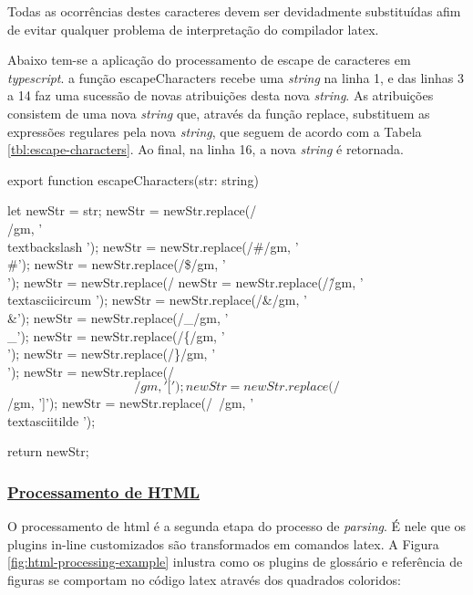 Todas as ocorrências destes caracteres devem ser devidadmente
substituídas afim de evitar qualquer problema de interpretação do
compilador
\acrshort{latex}.


Abaixo tem-se a aplicação do processamento de escape de caracteres
em \textit{typescript}. a função escapeCharacters recebe uma \textit{string} na linha 1,
e das linhas 3 a 14 faz uma sucessão de novas atribuições desta nova \textit{string}.
As atribuições consistem de uma nova \textit{string} que, através da função replace,
substituem as expressões regulares pela nova \textit{string}, que seguem de acordo
com a
Tabela \ref{tbl:escape-characters}.
Ao final, na linha 16, a nova \textit{string} é retornada.

\begin{codeEscape}
export function escapeCharacters(str: string){
    let newStr = str;
    newStr = newStr.replace(/\\/gm, '\\textbackslash ');
    newStr = newStr.replace(/#/gm, '\\#');
    newStr = newStr.replace(/\$/gm, '\\$$');
    newStr = newStr.replace(/%
    newStr = newStr.replace(/\^/gm, '\\textasciicircum ');
    newStr = newStr.replace(/&/gm, '\\&');
    newStr = newStr.replace(/_/gm, '\\_');
    newStr = newStr.replace(/\{/gm, '\\{');
    newStr = newStr.replace(/\}/gm, '\\}');
    newStr = newStr.replace(/\[/gm, '{[}');
    newStr = newStr.replace(/\]/gm, '{]}');
    newStr = newStr.replace(/~/gm, '\\textasciitilde ');

    return newStr;
}
\end{codeEscape}

\subsubsection{\underline{Processamento de HTML}}

O processamento de
\acrshort{html}
é a segunda etapa do processo de \textit{parsing}. É
nele que os plugins in-line customizados são transformados
em comandos
\acrshort{latex}.
A
Figura \ref{fig:html-processing-example}
inlustra como os plugins de glossário e referência de figuras
se comportam no código
\acrshort{latex}
através dos quadrados coloridos:

